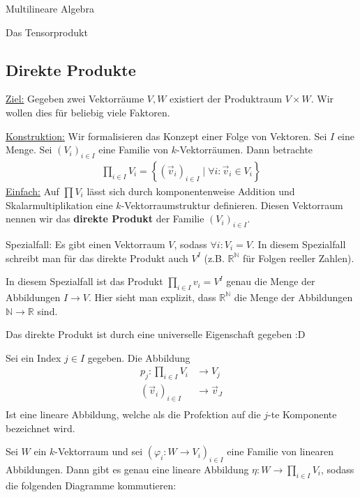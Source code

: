 \documentclass{report}
\newcommand*{\newpar}{\par\vspace{\baselineskip}\noindent}
\newcommand{\tbf}[1]{\textbf{#1}}
\newcommand{\ul}[1]{\underline{#1}}
\newcommand{\bN}{\mathbb{N}}
\newcommand{\bR}{\mathbb{R}}
\newcommand{\vv}{\vec{v}}
\begin{document}
\begin{chapter}{Multilineare Algebra}
\begin{section}{Das Tensorprodukt}
  \subsection{Direkte Produkte}
  \ul{Ziel:} Gegeben zwei Vektorräume $V, W$ existiert der Produktraum $V \times W$. Wir wollen dies für beliebig viele Faktoren.
  \newpar
  \ul{Konstruktion:} Wir formalisieren das Konzept einer Folge von Vektoren. Sei $I$ eine Menge. Sei $(V_i)_{i \in I}$ eine Familie von $k$-Vektorräumen. Dann betrachte
  \begin{align*}
   \prod_{i \in I} V_i = \left\{(\vv_i)_{i \in I} \mid \forall i : \vv_i \in V_i\right\}
  \end{align*}
  \ul{Einfach:} Auf $\prod V_i$ lässt sich durch komponentenweise Addition und Skalarmultiplikation eine $k$-Vektorraumstruktur definieren. Diesen Vektorraum nennen wir das \tbf{direkte Produkt} der Familie $(V_i)_{i \in I}$.
  \newpar
  Spezialfall: Es gibt einen Vektorraum $V$, sodass $\forall i : V_i = V$. In diesem Spezialfall schreibt man für das direkte Produkt auch $V^I$ (z.B. $\bR^\bN$ für Folgen reeller Zahlen).
  \newpar
  \begin{beobachtung}
   In diesem Spezialfall ist das Produkt $\prod_{i \in I} v_i = V^I$ genau die Menge der Abbildungen $I \to V$. Hier sieht man explizit, dass $\bR^\bN$ die Menge der Abbildungen $\bN \to \bR$ sind.
  \end{beobachtung}
   \noindent Das direkte Produkt ist durch eine universelle Eigenschaft gegeben :D
   
   \begin{definition}
    Sei ein Index $j \in I$ gegeben. Die Abbildung 
    \begin{align*}
            p_j : \prod_{i \in I} V_i &\to V_j\\
            (\vv_i)_{i \in I} &\to \vv_J\\
    \end{align*}
    Ist eine lineare Abbildung, welche als die Profektion auf die $j$-te Komponente bezeichnet wird.
   \end{definition}
   \begin{theorem}
    Sei $W$ ein $k$-Vektorraum und sei $(\varphi_i : W \to V_i)_{i \in I}$ eine Familie von linearen Abbildungen. Dann gibt es genau eine lineare Abbildung $\eta : W \to \prod_{i \in I} V_i$, sodass die folgenden Diagramme kommutieren:
    \begin{figure}[h!]
        \centering
    \end{figure}
   \end{theorem}

\end{section}

\end{chapter}
\end{document}
